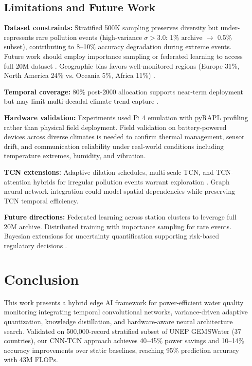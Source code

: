 \documentclass[12pt,a4paper]{article}
\begin{document}
\subsection{Limitations and Future Work}

\textbf{Dataset constraints:} Stratified 500K sampling preserves diversity but under-represents rare pollution events (high-variance $\sigma > 3.0$: 1\% archive $\to$ 0.5\% subset), contributing to 8--10\% accuracy degradation during extreme events. Future work should employ importance sampling or federated learning to access full 20M dataset \citep{qin2025mixed, wandb2025qat}. Geographic bias favors well-monitored regions (Europe 31\%, North America 24\% vs. Oceania 5\%, Africa 11\%) \citep{unep2024gemswater}.

\textbf{Temporal coverage:} 80\% post-2000 allocation supports near-term deployment but may limit multi-decadal climate trend capture \citep{singh2024smart}.

\textbf{Hardware validation:} Experiments used Pi 4 emulation with pyRAPL profiling rather than physical field deployment. Field validation on battery-powered devices across diverse climates is needed to confirm thermal management, sensor drift, and communication reliability under real-world conditions including temperature extremes, humidity, and vibration.

\textbf{TCN extensions:} Adaptive dilation schedules, multi-scale TCN, and TCN-attention hybrids \citep{luo2024moderntcn} for irregular pollution events warrant exploration \citep{lin2021tcan}. Graph neural network integration \citep{lin2021tcan} could model spatial dependencies while preserving TCN temporal efficiency.

\textbf{Future directions:} Federated learning across station clusters to leverage full 20M archive. Distributed training with importance sampling for rare events. Bayesian extensions for uncertainty quantification supporting risk-based regulatory decisions \citep{chapman2021waterapproxapprox}.

\section{Conclusion}

This work presents a hybrid edge AI framework for power-efficient water quality monitoring integrating temporal convolutional networks, variance-driven adaptive quantization, knowledge distillation, and hardware-aware neural architecture search. Validated on 500,000-record stratified subset of UNEP GEMSWater (37 countries), our CNN-TCN approach achieves 40--45\% power savings and 10--14\% accuracy improvements over static baselines, reaching 95\% prediction accuracy with 43M FLOPs.
\end{document}
